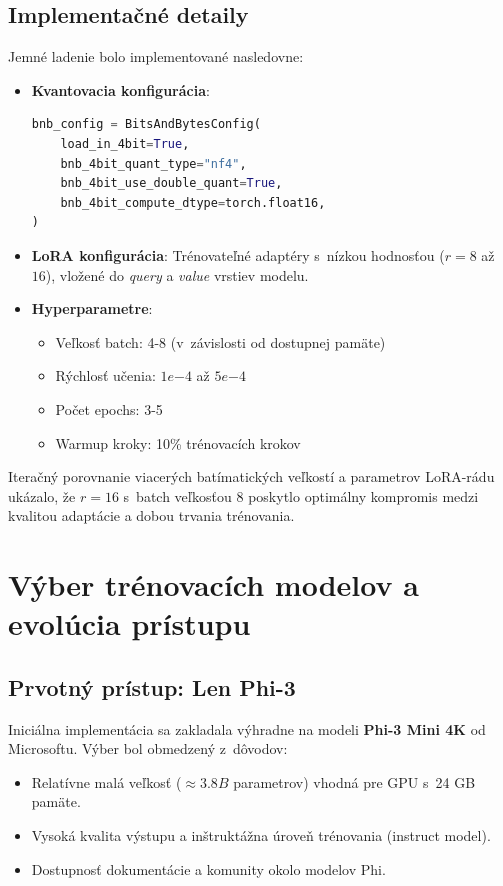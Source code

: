 \subsection{Implementačné detaily}

Jemné ladenie bolo implementované nasledovne:

\begin{itemize}
    \item \textbf{Kvantovacia konfigurácia}:
    \begin{lstlisting}[language=python, basicstyle=\small]
bnb_config = BitsAndBytesConfig(
    load_in_4bit=True,
    bnb_4bit_quant_type="nf4",
    bnb_4bit_use_double_quant=True,
    bnb_4bit_compute_dtype=torch.float16,
)
    \end{lstlisting}

    \item \textbf{LoRA konfigurácia}: Trénovateľné adaptéry s~nízkou hodnosťou ($r = 8$ až $16$), vložené do \textit{query} a \textit{value} vrstiev modelu.

    \item \textbf{Hyperparametre}:
    \begin{itemize}
        \item Veľkosť batch: 4-8 (v~závislosti od dostupnej pamäte)
        \item Rýchlosť učenia: $1e{-4}$ až $5e{-4}$
        \item Počet epochs: 3-5
        \item Warmup kroky: 10\% trénovacích krokov
    \end{itemize}
\end{itemize}

Iteračný porovnanie viacerých batímatických veľkostí a parametrov LoRA-rádu ukázalo, že $r = 16$ s~batch veľkosťou 8 poskytlo optimálny kompromis medzi kvalitou adaptácie a dobou trvania trénovania.


\section{Výber trénovacích modelov a evolúcia prístupu}

\subsection{Prvotný prístup: Len Phi-3}

Iniciálna implementácia sa zakladala výhradne na modeli \textbf{Phi-3 Mini 4K} od Microsoftu. Výber bol obmedzený z~dôvodov:
\begin{itemize}
    \item Relatívne malá veľkosť ($\approx 3.8B$ parametrov) vhodná pre GPU s~24 GB pamäte.
    \item Vysoká kvalita výstupu a inštruktážna úroveň trénovania (instruct model).
    \item Dostupnosť dokumentácie a komunity okolo modelov Phi.
\end{itemize}

